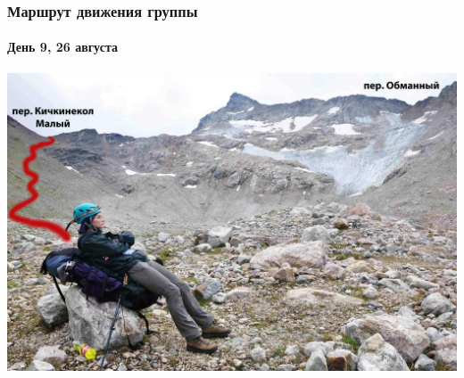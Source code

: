 \begin{frame}
	\frametitle{Маршрут движения группы}
	\framesubtitle{День 9, 26 августа}
	\centering
	\includegraphics[width=\textwidth]{../pics/DSC_0226}			
\end{frame}


